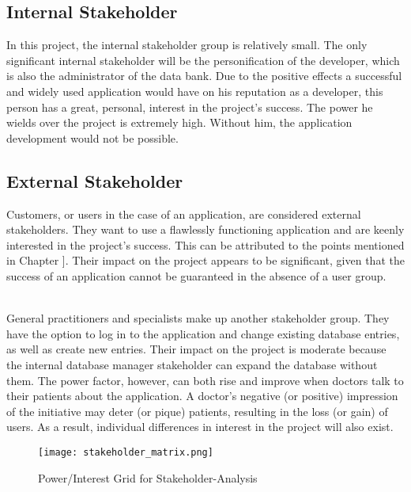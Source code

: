 \subsection{Internal Stakeholder}
In this project, the internal stakeholder group is relatively small. The only significant internal stakeholder will be the personification of the developer, which is also the administrator of the data bank. Due to the positive effects a successful and widely used application would have on his reputation as a developer, this person has a great, personal, interest in the project's success. The power he wields over the project is extremely high. Without him, the application development would not be possible. 
\subsection{External Stakeholder}
Customers, or users in the case of an application, are considered external stakeholders. They want to use a flawlessly functioning application and are keenly interested in the project's success. This can be attributed to the points mentioned in Chapter ]. Their impact on the project appears to be significant, given that the success of an application cannot be guaranteed in the absence of a user group.

\noindent \\
General practitioners and specialists make up another stakeholder group. They have the option to log in to the application and change existing database entries, as well as create new entries. Their impact on the project is moderate because the internal database manager stakeholder can expand the database without them. The power factor, however, can both rise and improve when doctors talk to their patients about the application. A doctor's negative (or positive) impression of the initiative may deter (or pique) patients, resulting in the loss (or gain) of users. As a result, individual differences in interest in the project will also exist.

\begin{figure}[h]
	\centering
	\texttt{[image: stakeholder\_matrix.png]}
	\caption[Power/Interest Grid for Stakeholder-Analysis ]{Power/Interest Grid for Stakeholder-Analysis}
\end{figure}	

